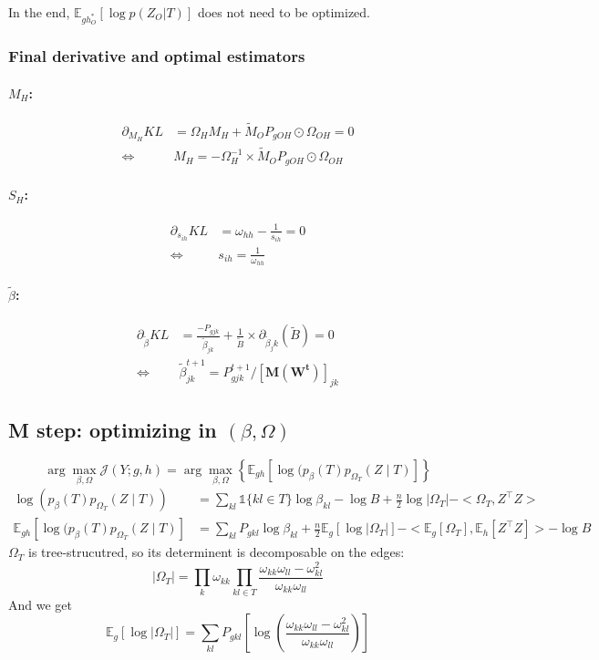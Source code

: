 \documentclass[11pt,a4paper]{article}
\newcommand{\argmax}{\arg\!\max}
\newcommand{\Esp}{\mathds{E}}
\begin{document}
In the end, $\Esp_{gh_O^*}[\log p(Z_O|T)]$ does not need to be optimized.

\subsubsection{Final derivative and optimal estimators}
\paragraph{$M_H$:}
\begin{align*}
\partial_{M_H} KL &= \Omega_H M_H + \widetilde{M}_OP_{gOH}\odot\Omega_{OH} =0\\
\iff& M_H =-\Omega_H^{-1}\times \widetilde{M}_OP_{gOH}\odot\Omega_{OH}
\end{align*}
\paragraph{$S_H$:}
\begin{align*}
\partial_{s_{ih}} KL &=  \omega_{hh}- \frac{1}{s_{ih}} = 0\\
\iff & s_{ih} = \frac{1}{\omega_{hh}}
\end{align*}
\paragraph{$\widetilde{\beta}$:}
\begin{align*}
\partial_{\widetilde{\beta}} KL &= \frac{-P_{gjk}}{\widetilde{\beta}_{jk}} + \frac{1}{\widetilde{B}} \times \partial_{\widetilde{\beta}_jk} (\widetilde{B})   =0\\
\iff & \widetilde{\beta}_{jk}^{t+1} = P_{gjk}^{t+1}/[\bm{M}(\bm{W^t})]_{jk}
\end{align*}
 
\subsection{M step: optimizing in $(\beta, \Omega)$}
 
$$ \argmax_{\beta, \Omega} \mathcal{J}(Y ; g,h) =\argmax_{\beta, \Omega} \left\{ \Esp_{gh} [\log (p_\beta(T)p_{\Omega_T}(Z\mid T) ]\right\} $$
\begin{align*}
\log (p_\beta(T)p_{\Omega_T}(Z\mid T))  &= \sum_{kl} \mathds{1}\{kl \in T\} \log \beta_{kl} - \log B + \frac{n}{2}\log |\Omega_T| - <\Omega_T,Z^\intercal Z>\\
\Esp_{gh} [\log (p_\beta(T)p_{\Omega_T}(Z\mid T) ] &= \sum_{kl} P_{gkl} \log\beta_{kl} +\frac{n}{2} \Esp_g[\log |\Omega_T|] - <\Esp_g [\Omega_T], \Esp_h[Z^\intercal Z]>- \log B
\end{align*}
$\Omega_T$ is tree-strucutred, so its determinent is decomposable on the edges:
$$|\Omega_{T}| = \prod_{k} \omega_{kk} \prod_{kl \in T} \frac{\omega_{kk}\omega_{ll}-\omega_{kl}^2}{\omega_{kk}\omega_{ll}}$$
And we get
$$\Esp_g[\log |\Omega_{T}|]= \sum _{kl} P_{gkl} \left[ \log\left(\frac{\omega_{kk}\omega_{ll}-\omega_{kl}^2}{\omega_{kk}\omega_{ll}}\right)\right]$$
\end{document}
